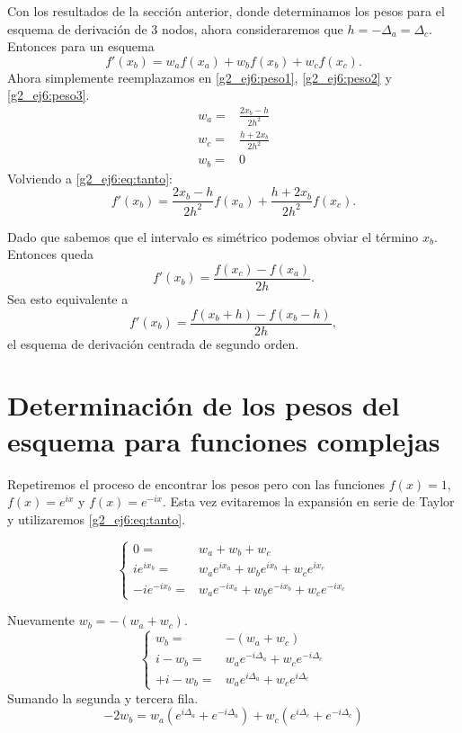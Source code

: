 \documentclass[../portafolio.tex]{subfiles}
\begin{document}
Con los resultados de la sección anterior, donde determinamos los pesos para el esquema de derivación de 3 nodos, ahora consideraremos que $h=-\Delta_a=\Delta_c$. Entonces para un esquema
\begin{equation}\label{g2_ej6:eq:tanto}
f'(x_b)=w_{a}f(x_{a}) +w_b f(x_b) + w_{c}f(x_{c}).
\end{equation}
Ahora simplemente reemplazamos en \eqref{g2_ej6:peso1}, \eqref{g2_ej6:peso2} y \eqref{g2_ej6:peso3}.
\begin{align}
w_a=&\frac{2x_b-h}{2h^2}\\
w_c=&\frac{h+2x_b}{2h^2}\\
w_b=&0
\end{align}
Volviendo a \eqref{g2_ej6:eq:tanto}:
\begin{equation}\label{g2_ej6:eq:centrada}
f'(x_b)=\frac{2x_b-h}{2h^2}f(x_{a})  + \frac{h+2x_b}{2h^2}f(x_{c}).
\end{equation}

Dado que sabemos que el intervalo es simétrico podemos obviar el término $x_b$. Entonces queda 
\begin{equation}
f'(x_b)=\frac{f(x_c)- f(x_a)}{2h}.
\end{equation}
Sea esto equivalente a 
\begin{equation}\label{g2_ej6:ahoara}
f'(x_b)=\frac{f(x_b +h)- f(x_b -h)}{2h},
\end{equation}
el esquema de derivación centrada de segundo orden.
\section{Determinación de los pesos del esquema para funciones complejas}
Repetiremos el proceso de encontrar los pesos pero con las funciones $f(x)=1$, $f(x)=e^{ix}$ y $f(x)=e^{-ix}$. Esta vez evitaremos la expansión en serie de Taylor y utilizaremos \eqref{g2_ej6:eq:tanto}.

\[
\begin{cases}
0=	& w_a+w_b  + w_c\\
ie^{ix_b}=	&w_a e^{ix_a}+w_b e^{ix_b} + w_c e^{ix_c} \\
-ie^{-ix_b}=&w_a e^{-ix_a} +w_b e^{-ix_b} + w_c e^{-ix_c}
\end{cases}
\]

Nuevamente $w_b=-(w_a+w_c)$. 
\[
\begin{cases}
w_b=&-(w_a+w_c)\\
i-w_b= &w_ae^{-i\Delta_a}   + w_ce^{-i\Delta_c}\\
+i-w_b= &w_a e^{ i\Delta_a} + w_c e^{ i\Delta_c}
\end{cases}
\]
Sumando la segunda y tercera fila.
\begin{equation}
-2w_b=w_a (e^{i\Delta_a}+e^{-i\Delta_a}) +w_c (e^{i\Delta_c}+e^{-i\Delta_c})
\end{equation}
\end{document}
